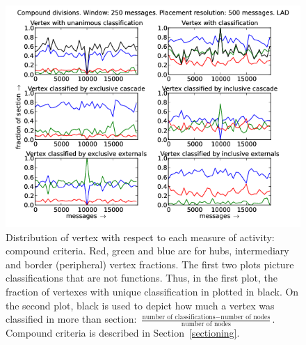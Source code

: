 \documentclass[%
 aip,
 jmp,%
 amsmath,amssymb,
 reprint,%
]{revtex4-1}
\begin{document}
\begin{figure}[hbtp] 
   \centering
        \includegraphics[width=\textwidth]{figs/LAD/250_2}
    \caption{Distribution of vertex with respect to each measure of activity: compound criteria. Red, green and blue are for hubs, intermediary and border (peripheral) vertex fractions. The first two plots picture classifications that are not functions. Thus, in the first plot, the fraction of vertexes with unique classification in plotted in black. On the second plot, black is used to depict how much a vertex was classified in more than section: $\frac{\text{number of classifications} - \text{number of nodes}}{\text{number of nodes}}$. Compound criteria is described in Section~\ref{sectioning}.}
    \label{fig:lad250_}
\end{figure}
\end{document}

